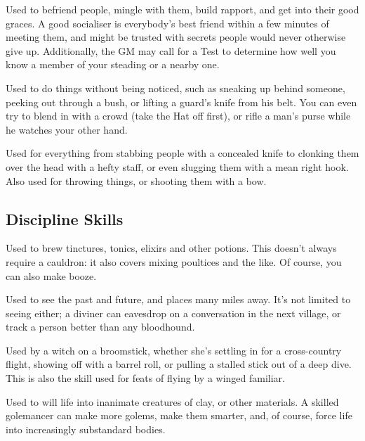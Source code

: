 
Used to befriend people, mingle with them, build rapport, and get into their good graces.
A good socialiser is everybody's best friend within a few minutes of meeting them, and might be trusted with secrets people would never otherwise give up.
Additionally, the GM may call for a  Test to determine how well you know a member of your steading or a nearby one.


Used to do things without being noticed, such as sneaking up behind someone, peeking out through a bush, or lifting a guard's knife from his belt.
You can even try to blend in with a crowd (take the Hat off first), or rifle a man's purse while he watches your other hand.


Used for everything from stabbing people with a concealed knife to clonking them over the head with a hefty staff, or even slugging them with a mean right hook.
Also used for throwing things, or shooting them with a bow.

\subsection{Discipline Skills}


Used to brew tinctures, tonics, elixirs and other potions.
This doesn't always require a cauldron: it also covers mixing poultices and the like.
Of course, you can also make booze.


Used to see the past and future, and places many miles away.
It's not limited to seeing either; a diviner can eavesdrop on a conversation in the next village, or track a person better than any bloodhound.


Used by a witch on a broomstick, whether she's settling in for a cross-country flight, showing off with a barrel roll, or pulling a stalled stick out of a deep dive.
This is also the skill used for feats of flying by a winged familiar.


Used to will life into inanimate creatures of clay, or other materials.
A skilled golemancer can make more golems, make them smarter, and, of course, force life into increasingly substandard bodies.

